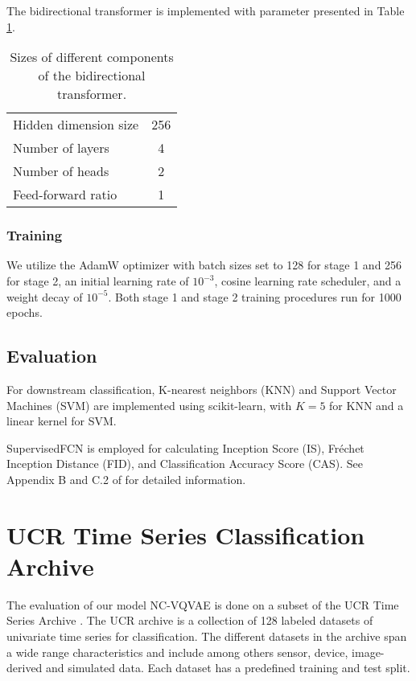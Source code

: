 \documentclass[../../thesis.tex]{subfiles}
\begin{document}
The bidirectional transformer is implemented with parameter presented in Table \ref{tab:bidirectional_transformer}.
\begin{table}[h]
    \centering
    \begin{tabular}{lc}
        \toprule
        Hidden dimension size& 256\\
        Number of layers & 4\\
        Number of heads & 2\\
        Feed-forward ratio& 1\\
        \bottomrule
    \end{tabular}
    \caption{Sizes of different components of the bidirectional transformer.}
    \label{tab:bidirectional_transformer}
\end{table}


\subsubsection{Training}
We utilize the AdamW optimizer with batch sizes set to 128 for stage 1 and 256 for stage 2, an initial learning rate of $10^{-3}$, cosine learning rate scheduler, and a weight decay of $10^{-5}$. Both stage 1 and stage 2 training procedures run for 1000 epochs.


\subsection{Evaluation}
For downstream classification, K-nearest neighbors (KNN) and Support Vector Machines (SVM) are implemented using scikit-learn, with $K=5$ for KNN and a linear kernel for SVM. \newline

SupervisedFCN is employed for calculating Inception Score (IS), Fréchet Inception Distance (FID), and Classification Accuracy Score (CAS). See Appendix B and C.2 of \cite{VQVAE} for detailed information.


\section{UCR Time Series Classification Archive}

The evaluation of our model NC-VQVAE is done on a subset of the UCR Time Series Archive \cite{UCRArchive2018}. The UCR archive is a collection of 128 labeled datasets of univariate time series for classification. The different datasets in the archive span a wide range characteristics and include among others sensor, device, image-derived and simulated data. Each dataset has a predefined training and test split.\newline
\end{document}
